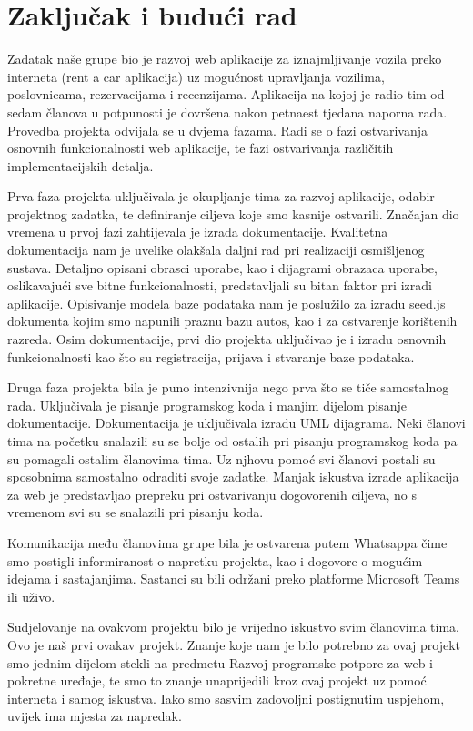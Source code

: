 \chapter{Zaključak i budući rad\hfill}
		
		Zadatak naše grupe bio je razvoj web aplikacije za iznajmljivanje vozila preko interneta (rent a car aplikacija) uz mogućnost upravljanja vozilima, poslovnicama, rezervacijama i recenzijama. Aplikacija na kojoj je radio tim od sedam članova u potpunosti je dovršena nakon petnaest tjedana naporna rada. Provedba projekta odvijala se u dvjema fazama. Radi se o fazi ostvarivanja osnovnih funkcionalnosti web aplikacije, te fazi ostvarivanja različitih implementacijskih detalja. 
		
		\setlength\parindent{24pt}
         Prva faza projekta uključivala je okupljanje tima za razvoj aplikacije, odabir projektnog zadatka, te definiranje ciljeva koje smo kasnije ostvarili. Značajan dio vremena u prvoj fazi zahtijevala je izrada dokumentacije. Kvalitetna dokumentacija nam je uvelike olakšala daljni rad pri realizaciji osmišljenog sustava. Detaljno opisani obrasci uporabe, kao i dijagrami obrazaca uporabe, oslikavajući sve bitne funkcionalnosti, predstavljali su bitan faktor pri izradi aplikacije. Opisivanje modela baze podataka  nam je poslužilo za izradu seed.js dokumenta kojim smo napunili praznu bazu autos, kao i za ostvarenje korištenih razreda. Osim dokumentacije, prvi dio projekta uključivao je i izradu osnovnih funkcionalnosti kao što su registracija, prijava i stvaranje baze podataka.
         
         \setlength\parindent{24pt}
        Druga faza projekta bila je puno intenzivnija nego prva što se tiče samostalnog rada. Uključivala je pisanje programskog koda i manjim dijelom pisanje dokumentacije. Dokumentacija je uključivala izradu UML dijagrama. Neki članovi tima na početku snalazili su se bolje od ostalih pri pisanju programskog koda pa su pomagali ostalim članovima tima. Uz njhovu pomoć svi članovi postali su sposobnima samostalno odraditi svoje zadatke. Manjak iskustva izrade aplikacija za web je predstavljao prepreku pri ostvarivanju dogovorenih ciljeva, no s vremenom svi su se snalazili pri pisanju koda. 
        
        \setlength\parindent{24pt}
        Komunikacija među članovima grupe bila je ostvarena putem Whatsappa čime smo postigli informiranost o napretku projekta, kao i dogovore o mogućim idejama i sastajanjima. Sastanci su bili održani preko platforme Microsoft Teams ili uživo. 
        
        \setlength\parindent{24pt}
        Sudjelovanje na ovakvom projektu bilo je vrijedno iskustvo svim članovima tima. Ovo je naš prvi ovakav projekt. Znanje koje nam je bilo potrebno za ovaj projekt smo jednim dijelom stekli na predmetu Razvoj programske potpore za web i pokretne uređaje, te smo to znanje unaprijedili kroz ovaj projekt uz pomoć interneta i samog iskustva. Iako smo sasvim zadovoljni postignutim uspjehom, uvijek ima mjesta za napredak. 
		
		\eject 